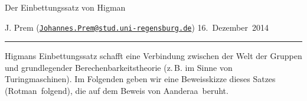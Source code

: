%

\vspace*{-0.5cm}
\begin{center}
    \Large Der Einbettungssatz von Higman
\end{center}

\medskip\noindent
J. Prem (\href{mailto:Johannes.Prem@stud.uni-regensburg.de}%
{\texttt{Johannes.Prem@stud.uni-regensburg.de}})
\hfill
16.~Dezember~2014
\\[-8pt]
\rule{\textwidth}{0.4pt}

\begin{center}
    \parbox{0.82\textwidth}{%
        Higmans Einbettungssatz schafft eine Verbindung zwischen der Welt der
        Gruppen und grundlegender Berechenbarkeitstheorie (z.\,B. im Sinne von
        Turingmaschinen). Im Folgenden geben wir eine Beweisskizze dieses
        Satzes (Rotman\,\cite{bookc:rotman95} folgend), die auf dem Beweis
        von Aanderaa\,\cite{paper:aanderaa73} beruht.
    }
\end{center}
